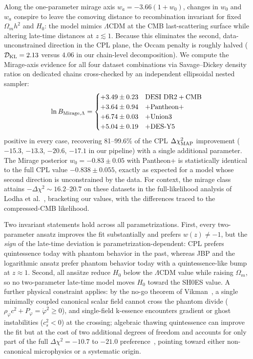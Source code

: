 \documentclass[aps,prd,preprint,superscriptaddress,nofootinbib]{revtex4-2}
\begin{document}
Along the one-parameter mirage axis $w_a = -3.66(1+w_0)$, changes in $w_0$ and $w_a$ conspire to leave the comoving distance to recombination invariant for fixed $\Omega_m h^2$ and $H_0$: the model mimics $\Lambda$CDM at the CMB last-scattering surface while altering late-time distances at $z \lesssim 1$. Because this eliminates the second, data-unconstrained direction in the CPL plane, the Occam penalty is roughly halved ($\mathcal{D}_{\rm KL} = 2.13$ versus $4.06$ in our chain-level decomposition). We compute the Mirage-axis evidence for all four dataset combinations via Savage--Dickey density ratios on dedicated chains cross-checked by an independent ellipsoidal nested sampler:
\begin{equation}
\ln B_{\rm Mirage,\Lambda} = \begin{cases}
+3.49 \pm 0.23 & {\rm DESI~DR2 + CMB} \\
+3.64 \pm 0.94 & + {\rm Pantheon+} \\
+6.74 \pm 0.03 & + {\rm Union3} \\
+5.04 \pm 0.19 & + {\rm DES\text{-}Y5}
\end{cases}
\label{eq:mirage}
\end{equation}
positive in every case, recovering 81--99.6\% of the CPL $\Delta\chi^2_{\rm MAP}$ improvement ($-15.3$, $-13.3$, $-20.6$, $-17.1$ in our pipeline) with a single additional parameter. The Mirage posterior $w_0 = -0.83 \pm 0.05$ with Pantheon+ is statistically identical to the full CPL value $-0.838 \pm 0.055$, exactly as expected for a model whose second direction is unconstrained by the data. For context, the mirage class attains $-\Delta\chi^2 \sim 16.2$--$20.7$ on these datasets in the full-likelihood analysis of Lodha et al.~\cite{Lodha2025}, bracketing our values, with the differences traced to the compressed-CMB likelihood.

Two invariant statements hold across all parametrizations. First, every two-parameter ansatz improves the fit substantially and prefers $w(z) \neq -1$, but the \emph{sign} of the late-time deviation is parametrization-dependent: CPL prefers quintessence today with phantom behavior in the past, whereas JBP and the logarithmic ansatz prefer phantom behavior today with a quintessence-like bump at $z \approx 1$. Second, all ans\"atze reduce $H_0$ below the $\Lambda$CDM value while raising $\Omega_m$, so no two-parameter late-time model moves $H_0$ toward the SH0ES value. A further physical constraint applies: by the no-go theorem of Vikman~\cite{Vikman2005}, a single minimally coupled canonical scalar field cannot cross the phantom divide ($\rho_\varphi c^2 + P_\varphi = \dot{\varphi}^2 \ge 0$), and single-field k-essence encounters gradient or ghost instabilities ($c_s^2 < 0$) at the crossing; algebraic thawing quintessence can improve the fit but at the cost of two additional degrees of freedom and accounts for only part of the full $\Delta\chi^2 = -10.7$ to $-21.0$ preference~\cite{Lodha2025}, pointing toward either non-canonical microphysics or a systematic origin.
\end{document}
